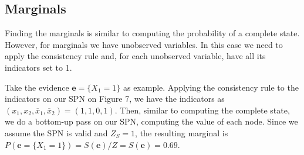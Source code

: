 \documentclass[a4paper,10pt]{article}
\theoremstyle{plain}
\begin{document}
\begin{figure}[h]
\end{figure}

\subsection{Marginals}

Finding the marginals is similar to computing the probability of a complete state. However, for
marginals we have unobserved variables. In this case we need to apply the consistency rule and, for
each unobserved variable, have all its indicators set to 1.

Take the evidence $\mathbf{e}=\{X_1=1\}$ as example. Applying the consistency rule to the indicators
on our SPN on Figure 7, we have the indicators as $(x_1,x_2,\overline{x}_1,\overline{x}_2)=
(1,1,0,1)$. Then, similar to computing the complete state, we do a bottom-up pass on our SPN,
computing the value of each node. Since we assume the SPN is valid and $Z_S=1$, the resulting
marginal is $P(\mathbf{e}=\{X_1=1\})=S(\mathbf{e})/Z=S(\mathbf{e})=0.69$.
\end{document}
